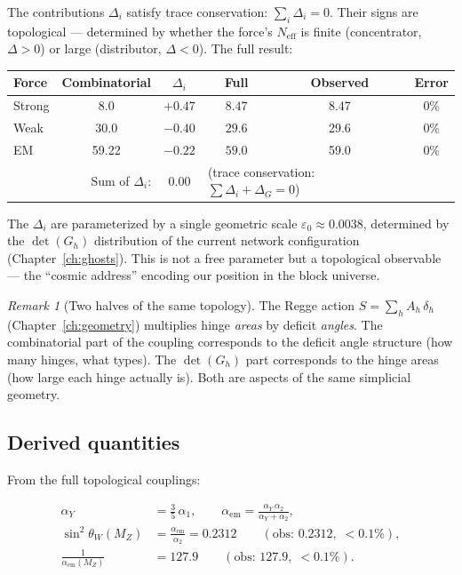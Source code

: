 \documentclass[12pt]{article}
\theoremstyle{remark}
\newtheorem{remark}[theorem]{Remark}
\theoremstyle{definition}
\begin{document}
The contributions $\Delta_i$ satisfy trace conservation: $\sum_i \Delta_i = 0$. Their signs are topological --- determined by whether the force's $N_\text{eff}$ is finite (concentrator, $\Delta > 0$) or large (distributor, $\Delta < 0$). The full result:

\begin{center}
\begin{tabular}{lccccc}
\hline
Force & Combinatorial & $\Delta_i$ & Full & Observed & Error \\
\hline
Strong & 8.0 & $+0.47$ & $\mathbf{8.47}$ & 8.47 & 0\% \\
Weak & 30.0 & $-0.40$ & $\mathbf{29.6}$ & 29.6 & 0\% \\
EM & 59.22 & $-0.22$ & $\mathbf{59.0}$ & 59.0 & 0\% \\
\hline
\multicolumn{2}{r}{Sum of $\Delta_i$:} & $\mathbf{0.00}$ & \multicolumn{2}{l}{(trace conservation: $\sum\Delta_i + \Delta_G = 0$)} \\
\hline
\end{tabular}
\end{center}

The $\Delta_i$ are parameterized by a single geometric scale $\varepsilon_0 \approx 0.0038$, determined by the $\det(G_h)$ distribution of the current network configuration (Chapter~\ref{ch:ghosts}). This is not a free parameter but a topological observable --- the ``cosmic address'' encoding our position in the block universe.

\begin{remark}[Two halves of the same topology]
The Regge action $S = \sum_h A_h\,\delta_h$ (Chapter~\ref{ch:geometry}) multiplies hinge \emph{areas} by deficit \emph{angles}. The combinatorial part of the coupling corresponds to the deficit angle structure (how many hinges, what types). The $\det(G_h)$ part corresponds to the hinge areas (how large each hinge actually is). Both are aspects of the same simplicial geometry.
\end{remark}

\subsection{Derived quantities}

From the full topological couplings:

\begin{align}
\alpha_Y &= \tfrac{3}{5}\,\alpha_1, \qquad \alpha_\text{em} = \frac{\alpha_Y\,\alpha_2}{\alpha_Y + \alpha_2}, \\
\sin^2\theta_W(M_Z) &= \frac{\alpha_\text{em}}{\alpha_2} = 0.2312 \qquad (\text{obs: } 0.2312,\; <0.1\%), \\
\frac{1}{\alpha_\text{em}(M_Z)} &= 127.9 \qquad (\text{obs: } 127.9,\; <0.1\%).
\end{align}
\end{document}
